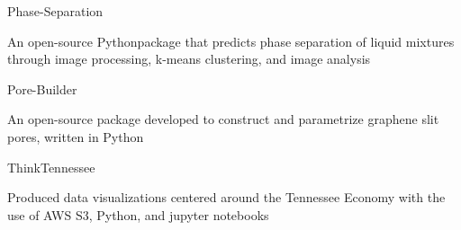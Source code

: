 
\begin{cventries}
  \cventry
    {} %
    {Phase-Separation} %
    {} %
    {} %
    {
      \begin{cvitems} %
        \item {An open-source Pythonpackage that predicts phase separation of liquid
            mixtures through image processing, k-means clustering, and image
              analysis}
      \end{cvitems}
    }

  \cventry
    {} %
    {Pore-Builder} %
    {} %
    {} %
    {
      \begin{cvitems} %
      	\item {An open-source package developed to construct and parametrize
            graphene slit pores, written in Python}
      \end{cvitems}
    }

  \cventry
    {} %
    {ThinkTennessee} %
    {} %
    {} %
    {
      \begin{cvitems} %
        \item {Produced data visualizations centered around the Tennessee Economy with the use of AWS S3, Python, and jupyter notebooks}
      \end{cvitems}
    }

\end{cventries}
